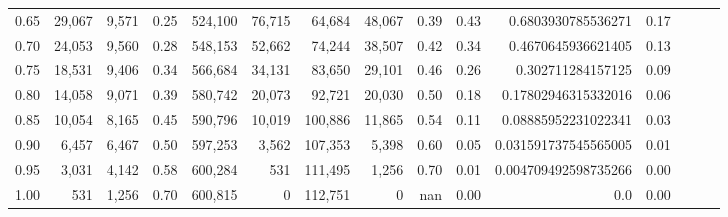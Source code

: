 \begin{tabular}{rrrrrrrrrrrrrrr}
0.65 &  29,067 &  9,571 &  0.25 &  524,100 &   76,715 &   64,684 &   48,067 &  0.39 &  0.43 &    0.6803930785536271 &      0.17 \\
0.70 &  24,053 &  9,560 &  0.28 &  548,153 &   52,662 &   74,244 &   38,507 &  0.42 &  0.34 &    0.4670645936621405 &      0.13 \\
0.75 &  18,531 &  9,406 &  0.34 &  566,684 &   34,131 &   83,650 &   29,101 &  0.46 &  0.26 &     0.302711284157125 &      0.09 \\
0.80 &  14,058 &  9,071 &  0.39 &  580,742 &   20,073 &   92,721 &   20,030 &  0.50 &  0.18 &   0.17802946315332016 &      0.06 \\
0.85 &  10,054 &  8,165 &  0.45 &  590,796 &   10,019 &  100,886 &   11,865 &  0.54 &  0.11 &   0.08885952231022341 &      0.03 \\
0.90 &   6,457 &  6,467 &  0.50 &  597,253 &    3,562 &  107,353 &    5,398 &  0.60 &  0.05 &  0.031591737545565005 &      0.01 \\
0.95 &   3,031 &  4,142 &  0.58 &  600,284 &      531 &  111,495 &    1,256 &  0.70 &  0.01 &  0.004709492598735266 &      0.00 \\
1.00 &     531 &  1,256 &  0.70 &  600,815 &        0 &  112,751 &        0 &   nan &  0.00 &                   0.0 &      0.00 \\
\bottomrule
\end{tabular}
